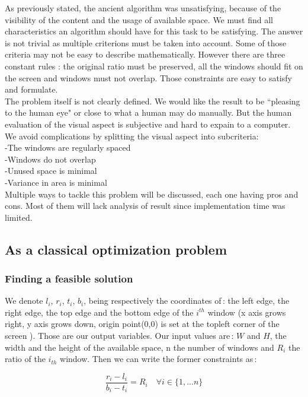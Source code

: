 \documentclass{acmtog}
\begin{document}
As previously stated, the ancient algorithm was unsatisfying, because of the visibility of the content and the usage of available space. We must find all characteristics  an algorithm should have for this task to be satisfying. The answer is not trivial as multiple criterions must be taken into account. Some of those criteria  may not be easy to describe mathematically. However there are three constant rules : the original ratio must be preserved, all the windows should fit on the screen and windows must not overlap. Those constraints are easy to satisfy and formulate.\\
The problem itself is not clearly defined. We would like the result to be ``pleasing to the human eye" or close to what a human may do manually. But the human evaluation of the visual aspect is subjective and hard to expain to a computer. We avoid complications by splitting the visual aspect into subcriteria:\\
-The windows are regularly spaced \\
-Windows do not overlap \\
-Unused space is minimal\\
-Variance in area is minimal\\
Multiple ways to tackle this problem will be discussed, each one having pros and cons. Most of them will lack analysis of result since implementation time was limited. 

\subsection{As a classical optimization problem}

\subsubsection{Finding a feasible solution}
We denote $l_i$, $r_i$, $t_i$, $b_i$, being respectively the coordinates of\,: the left edge, the right edge, the top edge and the bottom edge of the $i^{th}$ window (x axis grows right, y axis grows down, origin point(0,0) is set at the topleft corner of the screen ). Those are our output variables. Our input values are\,:  $W$ and $H$, the width and the height of the available space, n the number of windows and $R_i$ the ratio of the $i_{th}$ window. Then we can write the former constraints as\,:

\begin{equation}
\dfrac{r_i - l_i}{b_i - t_i} = R_i \quad \forall  i \in  \{1, ... n\}
\end{equation}
\end{document}
